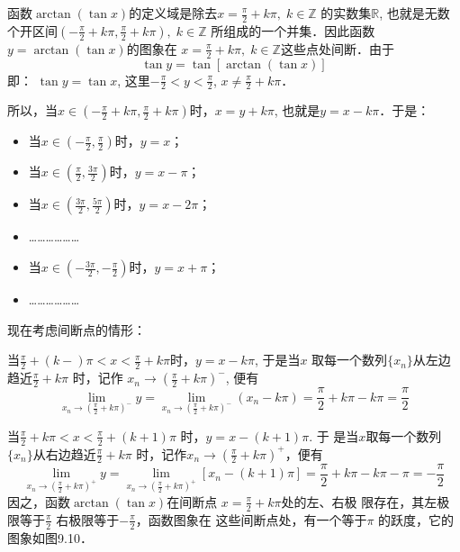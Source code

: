 \begin{solution}
函数$\arctan (\tan x)$的定义域是除去$x=\frac{\pi}{2}+k\pi,\; k\in\mathbb{Z}$
的实数集$\mathbb{R}$, 也就是无数个开区间$\left(-\frac{\pi}{2}+k\pi,\frac{\pi}{2}+k\pi\right),\; k\in\mathbb{Z}$
所组成的一个并集．因此函数$y=\arctan (\tan x)$的图象在
$x=\frac{\pi}{2}+k\pi,\; k\in\mathbb{Z}$这些点处间断．由于
\[\tan y=\tan[\arctan(\tan x)]\]
即：
$\tan y=\tan x$, 这里$-\frac{\pi}{2}<y<\frac{\pi}{2}$, $x\ne \frac{\pi}{2}+k\pi$．

所以，当$x\in\left(-\frac{\pi}{2}+k\pi,\frac{\pi}{2}+k\pi\right)$时，$x=y+k\pi$, 也就是$y=x-k\pi$．于是：
\begin{itemize}
    \item 当$x\in\left(-\frac{\pi}{2},\frac{\pi}{2}\right)$时，$y=x$；
    \item 当$x\in\left(\frac{\pi}{2},\frac{3\pi}{2}\right)$时，$y=x-\pi$；
    \item 当$x\in\left(\frac{3\pi}{2},\frac{5\pi}{2}\right)$时，$y=x-2\pi$；
    \item ………………
    \item 当$x\in\left(-\frac{3\pi}{2},-\frac{\pi}{2}\right)$时，$y=x+\pi$；
    \item ………………
\end{itemize}
现在考虑间断点的情形：

当$\frac{\pi}{2}+(k-)\pi<x<\frac{\pi}{2}+k\pi$时，$y=x-k\pi$, 于是当$x$
取每一个数列$\{x_n\}$从左边趋近$\frac{\pi}{2}+k\pi$ 时，记作
$x_n\to \left(\frac{\pi}{2}+k\pi \right)^-$, 
便有
\[\lim_{x_n\to \left(\tfrac{\pi}{2}+k\pi \right)^-}y=\lim_{x_n\to \left(\tfrac{\pi}{2}+k\pi \right)^-}(x_n-k\pi)=\frac{\pi}{2}+k\pi-k\pi=\frac{\pi}{2}\]

当$\frac{\pi}{2}+k\pi <x<\frac{\pi}{2}+(k+1)\pi$ 时，$y=x-(k+1)\pi$. 于
是当$x$取每一个数列$\{x_n\}$从右边趋近$\frac{\pi}{2}+k\pi$ 时，记作$x_n\to \left(\frac{\pi}{2}+k\pi\right)^+$，便有
\[\lim_{x_n\to \left(\tfrac{\pi}{2}+k\pi \right)^+}y=\lim_{x_n\to \left(\tfrac{\pi}{2}+k\pi \right)^+}[x_n-(k+1)\pi]=\frac{\pi}{2}+k\pi-k\pi-\pi=-\frac{\pi}{2}\]
因之，函数$\arctan(\tan x)$在间断点
$x=\frac{\pi}{2}+k\pi$处的左、右极
限存在，其左极限等于$\frac{\pi}{2}$
右极限等于$-\frac{\pi}{2}$，函数图象在
这些间断点处，有一个等于$\pi$ 的跃度，它的图象如图9.10．

\begin{figure}[htp]
    \centering
{}
    \caption{}
\end{figure}
\end{solution}

